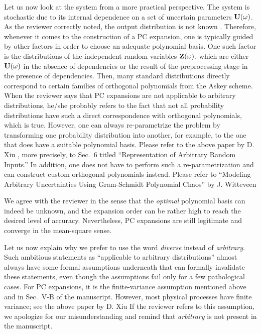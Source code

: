 \begin{authors}
Let us now look at the system from a more practical perspective.
The system is stochastic due to its internal dependence on a set of uncertain parameters $\mathbf{U}(\omega)$.
As the reviewer correctly noted, the output distribution is not known \apriori.
Therefore, whenever it comes to the construction of a PC expansion, one is typically guided by other factors in order to choose an adequate polynomial basis.
One such factor is the distributions of the independent random variables $\mathbf{Z}(\omega)$, which are either $\mathbf{U}(\omega)$ in the absence of dependencies or the result of the preprocessing stage in the presence of dependencies.
Then, many standard distributions directly correspond to certain families of orthogonal polynomials from the Askey scheme.
When the reviewer says that PC expansions are not applicable to arbitrary distributions, he/she probably refers to the fact that not all probability distributions have such a direct correspondence with orthogonal polynomials, which is true.
However, one can always re-parametrize the problem by transforming one probability distribution into another, for example, to the one that does have a suitable polynomial basis.
Please refer to the above paper by D. Xiu \etal, more precisely, to Sec.~6 titled ``Representation of Arbitrary Random Inputs.''
In addition, one does not have to perform such a re-parametrization and can construct custom orthogonal polynomials instead.
Please refer to ``Modeling Arbitrary Uncertainties Using Gram-Schmidt Polynomial Chaos'' by J. Witteveen \etal

We agree with the reviewer in the sense that the \emph{optimal} polynomial basis can indeed be unknown, and the expansion order can be rather high to reach the desired level of accuracy.
Nevertheless, PC expansions are still legitimate and converge in the mean-square sense.

Let us now explain why we prefer to use the word \emph{diverse} instead of \emph{arbitrary}.
Such ambitious statements as ``applicable to arbitrary distributions'' almost always have some formal assumptions underneath that can formally invalidate these statements, even though the assumptions fail only for a few pathological cases.
For PC expansions, it is the finite-variance assumption mentioned above and in Sec.~V-B of the manuscript.
However, most physical processes have finite variance; see the above paper by D. Xiu \etal{}
If the reviewer refers to this assumption, we apologize for our misunderstanding and remind that \emph{arbitrary} is not present in the manuscript.

\begin{actions}
\end{actions}
\end{authors}

